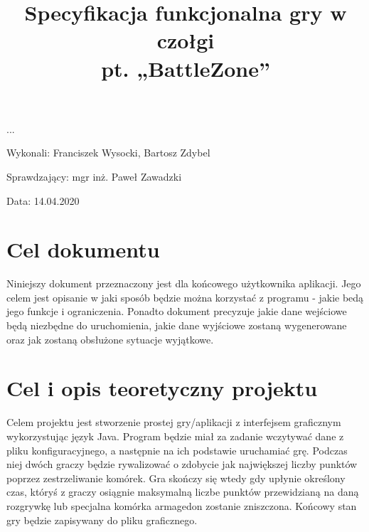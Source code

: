 \documentclass{article}
\title{Specyfikacja funkcjonalna gry w czołgi \\ pt. „BattleZone”}
\author{}
\date{}
\begin{document}
\maketitle

\begin{flushright}
\par ...
\vfill
\par
Wykonali: Franciszek Wysocki, Bartosz Zdybel

Sprawdzający: mgr inż. Paweł Zawadzki

Data: 14.04.2020
\end{flushright}

\thispagestyle{empty}
\newpage
\begin{frame}{}
    \tableofcontents
\end{frame}
\newpage

\section{Cel dokumentu}
{\fontsize{14}{14}\selectfont
Niniejszy dokument przeznaczony jest dla końcowego użytkownika aplikacji. Jego celem jest opisanie w jaki sposób będzie można korzystać z programu - jakie bedą jego funkcje i ograniczenia. Ponadto dokument precyzuje jakie dane wejściowe będą niezbędne do uruchomienia, jakie dane wyjściowe zostaną wygenerowane oraz jak zostaną obsłużone sytuacje wyjątkowe.
}
\section{Cel i opis teoretyczny projektu}
{\fontsize{14}{14}\selectfont
Celem projektu jest stworzenie prostej gry/aplikacji z interfejsem graficznym wykorzystując język Java. Program będzie miał za zadanie wczytywać dane z pliku konfiguracyjnego, a następnie na ich podstawie uruchamiać grę. Podczas niej dwóch graczy będzie rywalizować o zdobycie jak największej liczby punktów poprzez zestrzeliwanie komórek. Gra skończy się wtedy gdy upłynie określony czas, któryś z graczy osiągnie maksymalną liczbe punktów przewidzianą na daną rozgrywkę lub specjalna komórka armagedon zostanie zniszczona. Końcowy stan gry będzie zapisywany do pliku graficznego.
}
\end{document}
